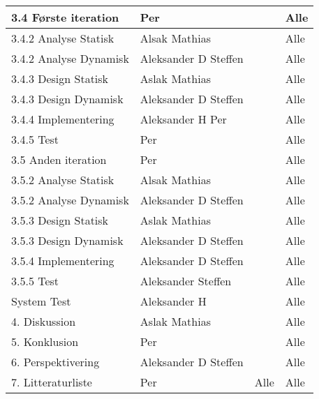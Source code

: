 \begin{center}
\begin{longtable}{|m{5.8cm}|m{3.5cm}|m{3.5cm}|m{3.2cm}|}
3.4 Første iteration & Per & & Alle\\ \hline
3.4.2 Analyse Statisk & Alsak \newline Mathias & & Alle\\ \hline
3.4.2 Analyse Dynamisk & Aleksander D \newline Steffen & & Alle\\ \hline
3.4.3 Design Statisk & Aslak \newline Mathias  & & Alle\\ \hline
3.4.3 Design Dynamisk & Aleksander D \newline Steffen &  & Alle\\ \hline
3.4.4 Implementering & Aleksander H \newline Per & & Alle\\ \hline
3.4.5 Test & Per & & Alle\\ \hline

3.5 Anden iteration & Per & & Alle\\ \hline
3.5.2 Analyse Statisk & Alsak \newline Mathias & & Alle\\ \hline
3.5.2 Analyse Dynamisk & Aleksander D \newline Steffen & & Alle\\ \hline
3.5.3 Design Statisk & Aslak \newline Mathias  & & Alle\\ \hline
3.5.3 Design Dynamisk & Aleksander D \newline Steffen &  & Alle\\ \hline
3.5.4 Implementering & Aleksander D \newline Steffen & & Alle\\ \hline
3.5.5 Test & Aleksander \newline Steffen & & Alle\\ \hline
System Test & Aleksander H & & Alle\\ \hline

4. Diskussion & Aslak \newline Mathias& & Alle\\ \hline

5. Konklusion & Per & & Alle\\ \hline

6. Perspektivering & Aleksander D \newline Steffen& & Alle\\ \hline

7. Litteraturliste & Per & Alle & Alle\\ \hline


\end{longtable}
\end{center}

